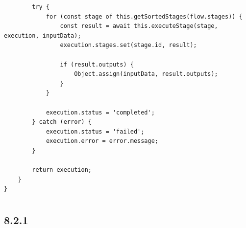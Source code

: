 \begin{verbatim}
        try {
            for (const stage of this.getSortedStages(flow.stages)) {
                const result = await this.executeStage(stage, execution, inputData);
                execution.stages.set(stage.id, result);
                
                if (result.outputs) {
                    Object.assign(inputData, result.outputs);
                }
            }
            
            execution.status = 'completed';
        } catch (error) {
            execution.status = 'failed';
            execution.error = error.message;
        }
        
        return execution;
    }
}
\end{verbatim}

\section{}\label{section-16}

\subsection{}\label{section-17}

\subsection{8.2.1}\label{section-18}

\subsubsection{}\label{section-19}

\paragraph{}\label{section-20}

\paragraph{}\label{section-21}

